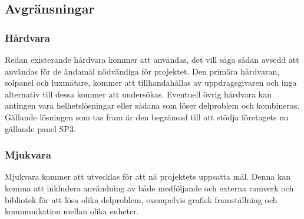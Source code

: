     \subsection{Avgränsningar} %
    \label{sub:avgr_nsningar}
        \subsubsection{Hårdvara} %
        \label{ssub:h_rdvara}
            Redan existerande hårdvara kommer att användas, det vill säga sådan avsedd att användas för de ändamål nödvändiga för projektet. 
            Den primära hårdvaran, solpanel och luxmätare, kommer att tillhandahållas av uppdragsgivaren och inga alternativ till dessa kommer att undersökas. 
            Eventuell övrig hårdvara kan antingen vara helhetslösningar eller sådana som löser delproblem och kombineras. 
            Gällande lösningen som tas fram är den begränsad till att stödja företagets nu gällande panel SP3.\bigskip

        \subsubsection{Mjukvara} %
        \label{ssub:mjukvara}
            Mjukvara kommer att utvecklas för att nå projektets uppsatta mål. 
            Denna kan komma att inkludera användning av både medföljande och externa ramverk och bibliotek för att lösa olika delproblem, exempelvis grafisk framställning och kommunikation mellan olika enheter.


